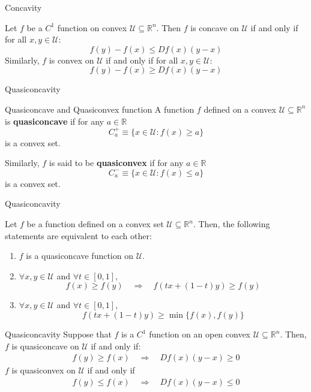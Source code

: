 \documentclass[aspectratio=169]{beamer}
\begin{document}
\begin{frame}{Concavity}
    \begin{theorem}
        Let $f$ be a $C^1$ function on convex $\mathcal{U}\subseteq\mathbb{R}^n$. Then $f$ is concave on $\mathcal{U}$ if and only if for all $x,y\in\mathcal{U}$:
        \[f(y)-f(x)\leq Df(x)(y-x)\]
        Similarly, $f$ is convex on $\mathcal{U}$ if and only if for all $x,y\in\mathcal{U}$:
        \[f(y)-f(x)\geq Df(x)(y-x)\]
    \end{theorem}
    
\end{frame}

\begin{frame}{Quasiconcavity}
    \begin{definition}{Quasiconcave and Quasiconvex function}
    A function $f$ defined on a convex $\mathcal{U}\subseteq\mathbb{R}^n$ is \textbf{quasiconcave} if for any $a\in\mathbb{R}$
    \[C^+_a\equiv \{x\in\mathcal{U}: f(x)\geq a\}\]
    is a convex set.
    
    Similarly, $f$ is said to be \textbf{quasiconvex} if for any $a\in\mathbb{R}$
    \[C^-_a\equiv \{x\in\mathcal{U}: f(x)\leq a\}\]
    is a convex set.
    \end{definition}
\end{frame}

\begin{frame}{Quasiconcavity}
    \begin{theorem}
        Let $f$ be a function defined on a convex set $\mathcal{U}\subseteq\mathbb{R}^n$. Then, the following statements are equivalent to each other:
        \begin{enumerate}
            \item $f$ is a quasiconcave function on $\mathcal{U}$.
            \item $\forall x,y\in\mathcal{U}$ and $\forall t\in[0,1]$, \[f(x)\geq f(y)\quad \Rightarrow\quad f(tx+(1-t)y)\geq f(y)\]
            \item $\forall x,y\in\mathcal{U}$ and $\forall t\in[0,1]$, \[f(tx+(1-t)y)\geq \min \{f(x),f(y)\}\]
        \end{enumerate}
    \end{theorem}
\end{frame}

\begin{frame}{Quasiconcavity}
    Suppose that $f$ is a $C^1$ function on an open convex $\mathcal{U}\subseteq\mathbb{R}^n$. Then, $f$ is quasiconcave on $\mathcal{U}$ if and only if:
    \begin{align*}
        f(y)\geq f(x)\quad \Rightarrow \quad Df(x)(y-x)\geq 0
    \end{align*}
    $f$ is quasiconvex on $\mathcal{U}$ if and only if
    \begin{align*}
        f(y)\leq f(x) \quad \Rightarrow \quad Df(x)(y-x)\leq 0
    \end{align*}
    
\end{frame}
\end{document}
